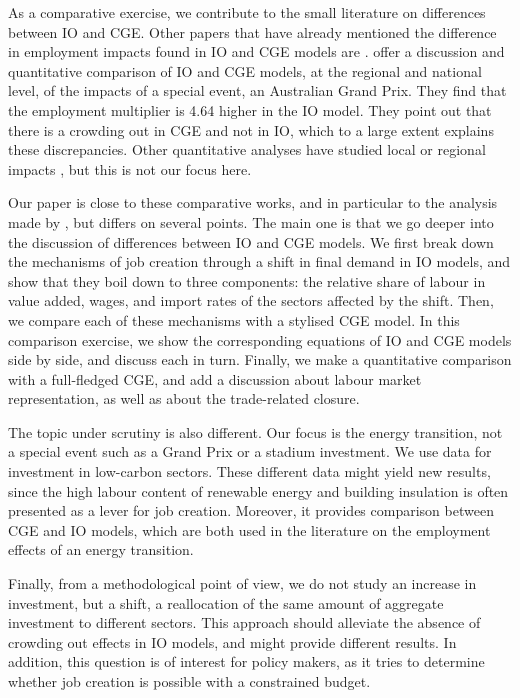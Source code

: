 As a comparative exercise, we contribute to the small literature on differences between IO and CGE. 
Other papers that have already mentioned the difference in employment impacts found in IO and CGE models are \citet{Partridge1998, OHara2013}. 
\citet{Dwyer2005} offer a discussion and quantitative comparison of IO and CGE models, at the regional and national level, of the impacts of a special event, an Australian Grand Prix. They find that the employment multiplier is 4.64 higher in the IO model. They point out that there is a crowding out in CGE and not in IO, which to a large extent explains these discrepancies. Other quantitative analyses have studied local or regional impacts \citep{Siegfried2000}, but this is not our focus here. 

Our paper is close to these comparative works, and in particular to the analysis made by \citet{Dwyer2005}, but differs on several points. 
The main one is that we go deeper into the discussion of differences between IO and CGE models. 
We first break down the mechanisms of job creation through a shift in final demand in IO models, and show that they boil down to three components: the relative share of labour in value added, wages, and import rates of the sectors affected by the shift. 
Then, we compare each of these mechanisms with a stylised CGE model. 
In this comparison exercise, we show the corresponding equations of IO and CGE models side by side, and discuss each in turn. Finally, we make a quantitative comparison with a full-fledged CGE, and add a discussion about labour market representation, as well as about the trade-related closure.

The topic under scrutiny is also different. Our focus is the energy transition, not a special event such as a Grand Prix or a stadium investment. We use data for investment in low-carbon sectors. These different data might yield new results, since the high labour content of renewable energy and building insulation is often presented as a lever for job creation. Moreover, it provides comparison between CGE and IO models, which are both used in the literature on the employment effects of an energy transition.

Finally, from a methodological point of view, we do not study an increase in investment, but a shift, a reallocation of the same amount of aggregate investment to different sectors. This approach should alleviate the absence of crowding out effects in IO models, and might provide different results. In addition, this question is of interest for policy makers, as it tries to determine whether job creation is possible with a constrained budget.


